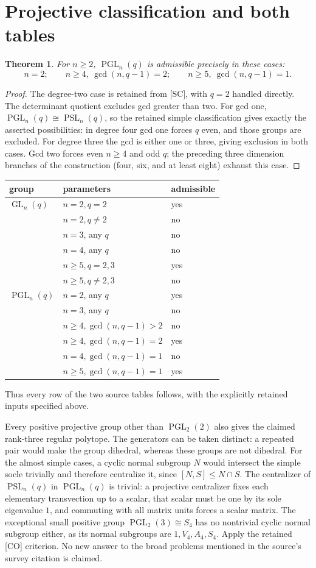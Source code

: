 \documentclass[11pt]{article}
\newtheorem{theorem}{Theorem}\newtheorem{lemma}[theorem]{Lemma}
\newcommand{\GL}{\operatorname{GL}}\newcommand{\SL}{\operatorname{SL}}
\newcommand{\PGL}{\operatorname{PGL}}\newcommand{\PSL}{\operatorname{PSL}}
\begin{document}
\section{Projective classification and both tables}
\begin{theorem}\label{pgl}
For $n\geq2$, $\PGL_n(q)$ is admissible precisely in these cases:
\[
 n=2;\qquad n\geq4,\ \gcd(n,q-1)=2;\qquad
 n\geq5,\ \gcd(n,q-1)=1.
\]
\end{theorem}
\begin{proof}
The degree-two case is retained from [SC], with $q=2$ handled directly.
The determinant quotient excludes gcd greater than two. For gcd one,
$\PGL_n(q)\cong\PSL_n(q)$, so the retained simple classification gives
exactly the asserted possibilities: in degree four gcd one forces $q$
even, and those groups are excluded. For degree three the gcd is either
one or three, giving exclusion in both cases. Gcd two forces even
$n\geq4$ and odd $q$; the preceding three dimension branches of the
construction (four, six, and at least eight) exhaust this case.
\end{proof}

\begin{center}
\begin{tabular}{lll}\toprule
group&parameters&admissible\\\midrule
$\GL_n(q)$&$n=2,q=2$&yes\\
&$n=2,q\ne2$&no\\
&$n=3$, any $q$&no\\
&$n=4$, any $q$&no\\
&$n\geq5,q=2,3$&yes\\
&$n\geq5,q\ne2,3$&no\\\midrule
$\PGL_n(q)$&$n=2$, any $q$&yes\\
&$n=3$, any $q$&no\\
&$n\geq4,\gcd(n,q-1)>2$&no\\
&$n\geq4,\gcd(n,q-1)=2$&yes\\
&$n=4,\gcd(n,q-1)=1$&no\\
&$n\geq5,\gcd(n,q-1)=1$&yes\\\bottomrule
\end{tabular}
\end{center}
Thus every row of the two source tables follows, with the explicitly
retained inputs specified above.

Every positive projective group other than $\PGL_2(2)$ also gives the
claimed rank-three regular polytope. The generators can be taken distinct:
a repeated pair would make the group dihedral, whereas these groups are
not dihedral. For the almost simple cases, a cyclic normal subgroup $N$
would intersect the simple socle trivially and therefore centralize it,
since $[N,S]\leq N\cap S$. The centralizer of $\PSL_n(q)$ in
$\PGL_n(q)$ is trivial: a projective centralizer fixes each elementary
transvection up to a scalar, that scalar must be one by its sole eigenvalue
$1$, and commuting with all matrix units forces a scalar matrix.
The exceptional small positive group $\PGL_2(3)\cong S_4$ has no
nontrivial cyclic normal subgroup either, as its normal subgroups are
$1,V_4,A_4,S_4$. Apply the retained [CO] criterion. No new answer to the
broad problems mentioned in the source's survey citation is claimed.
\end{document}

